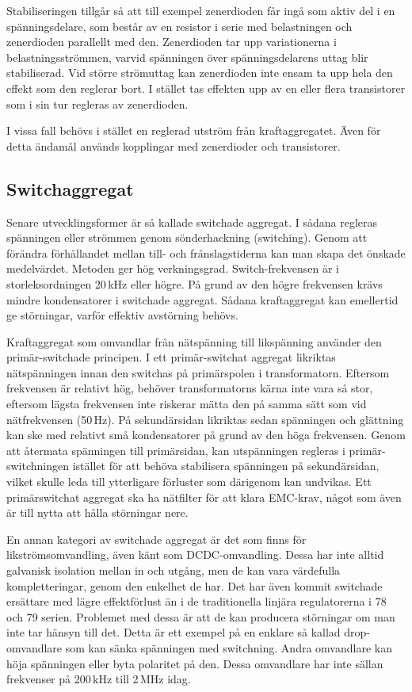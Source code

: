 Stabiliseringen tillgår så att till exempel zenerdioden får ingå som aktiv del
i en spänningsdelare, som består av en resistor i serie med belastningen och
zenerdioden parallellt med den.
Zenerdioden tar upp variationerna i belastningsströmmen, varvid spänningen över
spänningsdelarens uttag blir stabiliserad.
Vid större strömuttag kan zenerdioden inte ensam ta upp hela den effekt som den
reglerar bort.
I stället tas effekten upp av en eller flera transistorer som i sin tur
regleras av zenerdioden.

I vissa fall behövs i stället en reglerad utström från kraftaggregatet.
Även för detta ändamål används kopplingar med zenerdioder och transistorer.

\subsection{Switchaggregat}

Senare utvecklingsformer är så kallade switchade aggregat.
I sådana regleras spänningen eller strömmen genom sönderhackning (switching).
Genom att förändra förhållandet mellan till- och frånslagstiderna kan man skapa
det önskade medelvärdet.
Metoden ger hög verkningsgrad.
Switch-frekvensen är i storleksordningen 20\,kHz eller högre.
På grund av den högre frekvensen krävs mindre kondensatorer i switchade
aggregat.
Sådana kraftaggregat kan emellertid ge störningar, varför effektiv avstörning
behövs.

Kraftaggregat som omvandlar från nätspänning till likspänning använder
den primär-switchade principen.
I ett primär-switchat aggregat likriktas nätspänningen innan den switchas på
primärspolen i transformatorn.
Eftersom frekvensen är relativt hög, behöver transformatorns kärna inte
vara så stor, eftersom lägsta frekvensen inte riskerar mätta den på samma
sätt som vid nätfrekvensen (50\,Hz).
På sekundärsidan likriktas sedan spänningen och glättning kan ske med relativt
små kondensatorer på grund av den höga frekvensen.
Genom att återmata spänningen till primärsidan, kan utspänningen regleras i
primär-switchningen istället för att behöva stabilisera spänningen på
sekundärsidan, vilket skulle leda till ytterligare förluster som därigenom kan
undvikas.
Ett primärswitchat aggregat ska ha nätfilter för att klara EMC-krav, något som
även är till nytta att hålla störningar nere.

En annan kategori av switchade aggregat är det som finns för
likströmsomvandling, även känt som DCDC-omvandling.
Dessa har inte alltid galvanisk isolation mellan in och utgång, men de kan vara
värdefulla kompletteringar, genom den enkelhet de har.
Det har även kommit switchade ersättare med lägre effektförlust än i de
traditionella linjära regulatorerna i 78 och 79 serien.
Problemet med dessa är att de kan producera störningar om man inte tar hänsyn
till det.
Detta är ett exempel på en enklare så kallad drop-omvandlare som kan sänka
spänningen med switchning.
Andra omvandlare kan höja spänningen eller byta polaritet på den.
Dessa omvandlare har inte sällan frekvenser på 200\,kHz till 2\,MHz idag.

